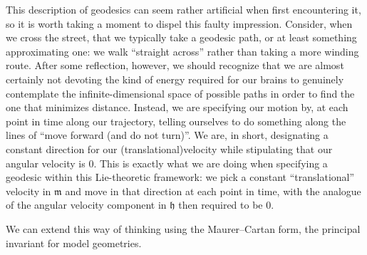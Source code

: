 \documentclass[12pt,a4paper]{amsart}
\theoremstyle{definition}
\begin{document}
This description of geodesics can seem rather artificial when first encountering it, so it is worth taking a moment to dispel this faulty impression. Consider, when we cross the street, that we typically take a geodesic path, or at least something approximating one: we walk ``straight across'' rather than taking a more winding route. After some reflection, however, we should recognize that we are almost certainly not devoting the kind of energy required for our brains to genuinely contemplate the infinite-dimensional space of possible paths in order to find the one that minimizes distance. Instead, we are specifying our motion by, at each point in time along our trajectory, telling ourselves to do something along the lines of ``move forward (and do not turn)''. We are, in short, designating a constant direction for our (translational)\linebreak velocity while stipulating that our angular velocity is $0$. This is exactly what we are doing when specifying a geodesic within this Lie-theoretic framework: we pick a constant ``translational'' velocity in $\mathfrak{m}$ and move in that direction at each point in time, with the analogue of the angular velocity component in $\mathfrak{h}$ then required to be $0$.

We can extend this way of thinking using the Maurer--Cartan form, the principal invariant for model geometries.
\end{document}
